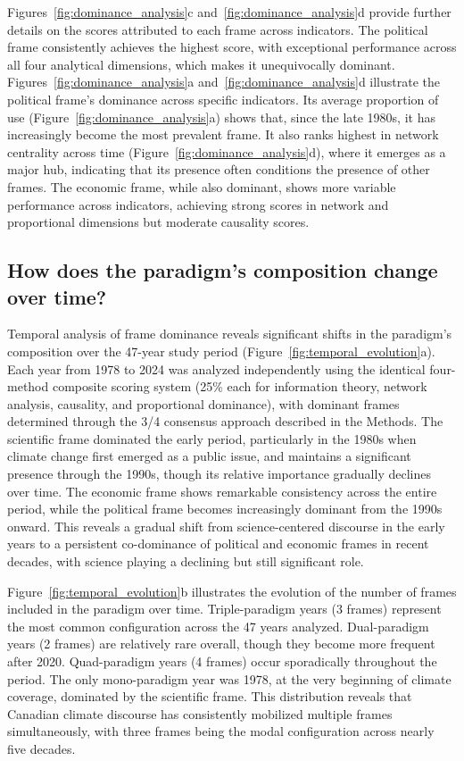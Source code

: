 \documentclass[12pt]{article}
\begin{document}
Figures~\ref{fig:dominance_analysis}c and~\ref{fig:dominance_analysis}d provide further details on the scores attributed to each frame across indicators. The political frame consistently achieves the highest score, with exceptional performance across all four analytical dimensions, which makes it unequivocally dominant. Figures~\ref{fig:dominance_analysis}a and~\ref{fig:dominance_analysis}d illustrate the political frame's dominance across specific indicators. Its average proportion of use (Figure~\ref{fig:dominance_analysis}a) shows that, since the late 1980s, it has increasingly become the most prevalent frame. It also ranks highest in network centrality across time (Figure~\ref{fig:dominance_analysis}d), where it emerges as a major hub, indicating that its presence often conditions the presence of other frames. The economic frame, while also dominant, shows more variable performance across indicators, achieving strong scores in network and proportional dimensions but moderate causality scores.

\subsection{How does the paradigm's composition change over time?}

Temporal analysis of frame dominance reveals significant shifts in the paradigm's composition over the 47-year study period (Figure~\ref{fig:temporal_evolution}a). Each year from 1978 to 2024 was analyzed independently using the identical four-method composite scoring system (25\% each for information theory, network analysis, causality, and proportional dominance), with dominant frames determined through the 3/4 consensus approach described in the Methods. The scientific frame dominated the early period, particularly in the 1980s when climate change first emerged as a public issue, and maintains a significant presence through the 1990s, though its relative importance gradually declines over time. The economic frame shows remarkable consistency across the entire period, while the political frame becomes increasingly dominant from the 1990s onward. This reveals a gradual shift from science-centered discourse in the early years to a persistent co-dominance of political and economic frames in recent decades, with science playing a declining but still significant role.

Figure~\ref{fig:temporal_evolution}b illustrates the evolution of the number of frames included in the paradigm over time. Triple-paradigm years (3 frames) represent the most common configuration across the 47 years analyzed. Dual-paradigm years (2 frames) are relatively rare overall, though they become more frequent after 2020. Quad-paradigm years (4 frames) occur sporadically throughout the period. The only mono-paradigm year was 1978, at the very beginning of climate coverage, dominated by the scientific frame. This distribution reveals that Canadian climate discourse has consistently mobilized multiple frames simultaneously, with three frames being the modal configuration across nearly five decades.
\end{document}
